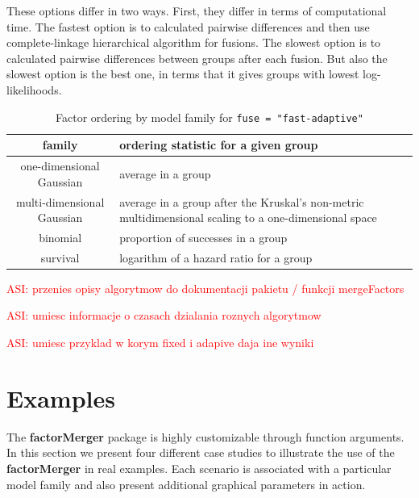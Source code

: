 \documentclass[12pt]{article}
\newcommand{\factorMerger}{\textbf{factorMerger }}
\newcommand{\todo}{\textcolor{red}}
\begin{document}
These options differ in two ways. First, they differ in terms of computational time. The fastest option is to calculated pairwise differences and then use complete-linkage hierarchical algorithm for fusions. The slowest option is to calculated pairwise differences between groups after each fusion. But also the slowest option is the best one, in terms that it gives groups with lowest log-likelihoods.

\begin{table}[H]
\centering \begin{tabular}[t]{c|p{9cm}}
\hline \textbf{family} & \textbf{ordering statistic for a given group} \\
\hline one-dimensional Gaussian & average in a group \\
\hline multi-dimensional Gaussian & average in a group after the Kruskal's non-metric multidimensional scaling \citep{MASS} to a one-dimensional space \\
\hline binomial & proportion of successes in a group\\
\hline survival & logarithm of a hazard ratio for a group\\
\hline 
\end{tabular}
\caption{\label{tab:ordering}Factor ordering by model family for \texttt{fuse = {"}fast-adaptive{"}}}
\end{table}

\todo{ASI: przenies opisy algorytmow do dokumentacji pakietu / funkcji mergeFactors}

\todo{ASI: umiesc informacje o czasach dzialania roznych algorytmow}

\todo{ASI: umiesc przyklad w korym fixed i adapive daja ine wyniki}


\clearpage










\section{Examples}
\label{sec:examples}

The \textbf{factorMerger} package is highly customizable through function arguments.
In this section we present four different case studies to illustrate the use of the \factorMerger in real examples. Each scenario is associated with a particular model family and also present additional graphical parameters in action. 
\end{document}
